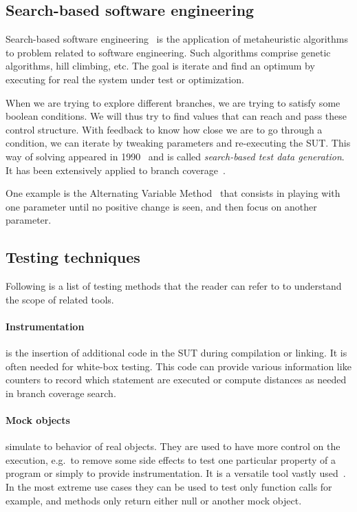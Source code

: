 \documentclass{llncs2e/llncs}
\begin{document}
\subsection{Search-based software engineering}
\label{sbse}

Search-based software engineering~\cite{harman2001search} is the application of
metaheuristic algorithms to problem related to software engineering. Such
algorithms comprise genetic algorithms, hill climbing, etc. The goal is iterate
and find an optimum by executing for real the system under test or optimization.

When we are trying to explore different branches, we are trying to satisfy some
boolean conditions. We will thus try to find values that can reach and pass
these control structure. With feedback to know how close we are to go through a
condition, we can iterate by tweaking parameters and re-executing the SUT\@.
This way of solving appeared in 1990~\cite{korel1990automated} and is called
\textit{search-based test data generation}. It has been extensively applied to
branch
coverage~\cite{mcminn2004search,lakhotia2007multi,mcminn2007iguana,Kim2017ts}.

One example is the Alternating Variable Method~\cite{mcminn2016avmf} that
consists in playing with one parameter until no positive change is seen, and
then focus on another parameter.


\subsection{Testing techniques} %
\label{techniques}

Following is a list of testing methods that the reader can refer to to
understand the scope of related tools.

\paragraph{Instrumentation} is the insertion of additional code in the SUT
during compilation or linking. It is often needed for white-box testing. This
code can provide various information like counters to record which statement are
executed or compute distances as needed in branch coverage search.

\paragraph{Mock objects} simulate to behavior of real objects. They are used to
have more control on the execution, e.g.\ to remove some side effects to test
one particular property of a program or simply to provide instrumentation. It is
a versatile tool vastly
used~\cite{mackinnon2000endo,taneja2010moda,freeman2004mock,tillmann2006mock}.
In the most extreme use cases they can be used to test only function calls for
example, and methods only return either null or another mock object.
\end{document}
